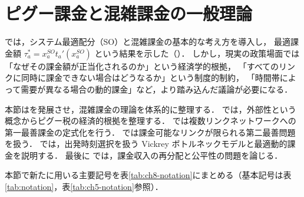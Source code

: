 
\section{ピグー課金と混雑課金の一般理論}
\label{sec:ch8-pigou}

では，システム最適配分（SO）と混雑課金の基本的な考え方を導入し，
最適課金額 $\tau_a^* = x_a^{SO} t_a'(x_a^{SO})$ という結果を示した（）．
しかし，現実の政策場面では「なぜその課金額が正当化されるのか」という経済学的根拠，
「すべてのリンクに同時に課金できない場合はどうなるか」という制度的制約，
「時間帯によって需要が異なる場合の動的課金」など，より踏み込んだ議論が必要になる．

本節はを発展させ，混雑課金の理論を体系的に整理する．
 では，外部性という概念からピグー税の経済的根拠を整理する．
 では複数リンクネットワークへの第一最善課金の定式化を行う．
 では課金可能なリンクが限られる第二最善問題を扱う．
 では，出発時刻選択を扱う
Vickrey ボトルネックモデルと最適動的課金を説明する．
最後に  では，課金収入の再分配と公平性の問題を論じる．

本節で新たに用いる主要記号を表\ref{tab:ch8-notation}にまとめる（基本記号は表\ref{tab:notation}，表\ref{tab:ch5-notation}参照）．

